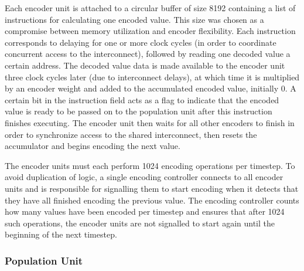 \documentclass[english]{article}
\begin{document}
Each encoder unit is attached to a circular buffer of size 8192
containing a list of instructions for calculating one encoded value. 
This size was chosen as a compromise between memory utilization and encoder flexibility.
Each instruction corresponds to delaying for one or more clock cycles
(in order to coordinate concurrent access to the interconnect),
followed by reading one decoded value a certain address.
The decoded value data is made available to the encoder unit three clock cycles later
(due to interconnect delays), at which time it is multiplied by an encoder weight
and added to the accumulated encoded value, initially 0.
A certain bit in the instruction field acts as a flag to indicate that the encoded value is ready to be passed on to the population unit after this
instruction finishes executing. The encoder unit then waits for all other encoders to finish in order to synchronize
access to the shared interconnect, then resets the accumulator and begins encoding the next value.

The encoder units must each perform 1024 encoding operations per timestep.
To avoid duplication of logic, a single encoding controller connects to all encoder units and is responsible for
signalling them to start encoding when it detects that they have all finished encoding the previous value.
The encoding controller counts how many values have been encoded per timestep and
ensures that after 1024 such operations, the encoder units are not signalled to start again until
the beginning of the next timestep.

\subsubsection{Population Unit}
\end{document}
